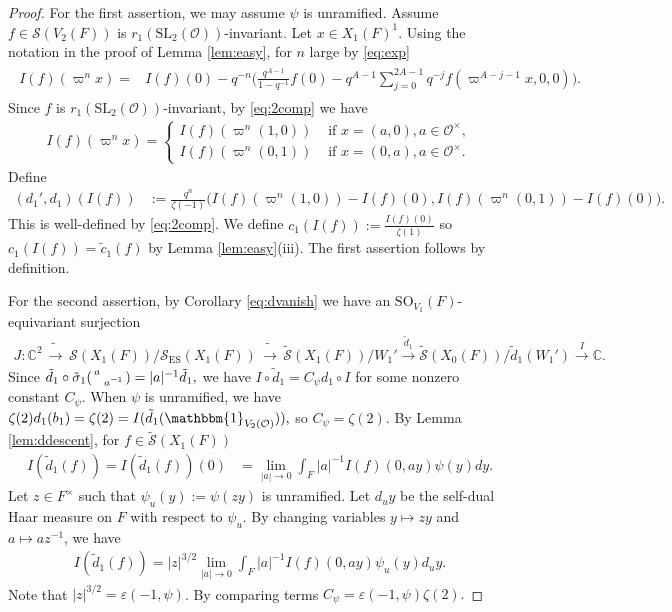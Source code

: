 \documentclass[11pt,a4paper,reqno]{amsart}
\theoremstyle{remark}
\numberwithin{equation}{section}
\newcommand{\SL}{\mathrm{SL}}
\newcommand{\lto}{\,\longrightarrow\,}
\newcommand{\OO}{\mathcal{O}}
\newcommand{\CC}{\mathbb{C}}
\theoremstyle{definition}
\numberwithin{equation}{section}
\newcommand{\one}{\mathbbm{1}}
\newenvironment{psmatrix}
  {\left(\begin{smallmatrix}}
  {\end{smallmatrix}\right)}
\begin{document}
\begin{proof}
For the first assertion, we may assume $\psi$ is unramified. Assume $f\in \mathcal{S}(V_2(F))$ is $r_1(\SL_2(\OO))$-invariant. Let $x\in X_1(F)^1.$ Using the notation in the proof of Lemma \ref{lem:easy}, for $n$ large by \eqref{eq:exp}
\begin{align}\label{eq:2comp}
\begin{split}
    I(f)(\varpi^n x)=&I(f)(0)-q^{-n}\Big(\frac{q^{A-1}}{1-q^{-1}}f(0)-q^{A-1}\sum_{j=0}^{2A-1} q^{-j}f(\varpi^{A-j-1}x,0,0)\Big).
\end{split}
\end{align}
Since $f$ is $r_1(\SL_2(\OO))$-invariant, by \eqref{eq:2comp} we have
\begin{align*}
    I(f)(\varpi^nx)=\begin{cases}
    I(f)(\varpi^n(1,0)) &\textrm{ if } x=(a,0), a\in \OO^\times,\\
    I(f)(\varpi^n(0,1))& \textrm{ if } x=(0,a), a\in \OO^\times.
    \end{cases}
\end{align*}
Define
\begin{align*}
    (d_1',d_1)(I(f))&:=\frac{q^n}{\zeta(-1)}\big(I(f)(\varpi^n(1,0))-I(f)(0), I(f)(\varpi^n(0,1))-I(f)(0)\big).
\end{align*}
This is well-defined by \eqref{eq:2comp}. We define $c_1(I(f)):=\frac{I(f)(0)}{\zeta(1)}$ so $c_1(I(f))=\tilde{c}_1(f)$ by Lemma \ref{lem:easy}(iii). The first assertion follows by definition.

For the second assertion, by Corollary \ref{eq:dvanish} we have an $\mathrm{SO}_{V_1}(F)$-equivariant surjection
\begin{align*}
    J:\CC^2 \tilde{\lto} \mathcal{S}(X_{1}(F))/\mathcal{S}_{\mathrm{ES}}(X_{1}(F))\tilde{\lto} \widetilde{\mathcal{S}}(X_1(F))/W_1'\xrightarrow{\tilde{d}_1} \widetilde{\mathcal{S}}(X_0(F))/\tilde{d}_1(W_1')\xrightarrow{\,\,I\,\,} \CC.
\end{align*}
Since $\tilde{d}_1\circ \tilde{\sigma}_1\begin{psmatrix}
a & \\
 & a^{-1}
\end{psmatrix}=|a|^{-1}\tilde{d}_1,$ we have $I\circ \tilde{d}_1=C_\psi d_1\circ I$ for some nonzero constant $C_\psi$. When $\psi$ is unramified, we have $\zeta(2)d_1(b_1)=\zeta(2)=I(\tilde{d}_1(\one_{V_2(\OO)})),$ so $C_\psi=\zeta(2)$. By Lemma \ref{lem:ddescent}, for $f\in \widetilde{\mathcal{S}}(X_1(F))$
\begin{align*}
    I(\tilde{d}_1(f))=I(\tilde{d}_1(f))(0)&=\lim_{|a|\to 0}\int_{F} |a|^{-1}I(f)(0,ay)\psi(y)dy.
\end{align*}
Let $z\in F^\times$ such that $\psi_u(y):=\psi(zy)$ is unramified. Let $d_u y$ be the self-dual Haar measure on $F$ with respect to $\psi_u$. By changing variables $y\mapsto zy$ and $a\mapsto az^{-1}$, we have
\begin{align*}
    I(\tilde{d}_1(f))=|z|^{3/2}\lim_{|a|\to 0}\int_{F} |a|^{-1}I(f)(0,ay)\psi_u(y)d_u y.
\end{align*}
Note that $|z|^{3/2}=\varepsilon(-1,\psi)$. By comparing terms $C_\psi=\varepsilon(-1,\psi)\zeta(2).$


\end{proof}
\end{document}
